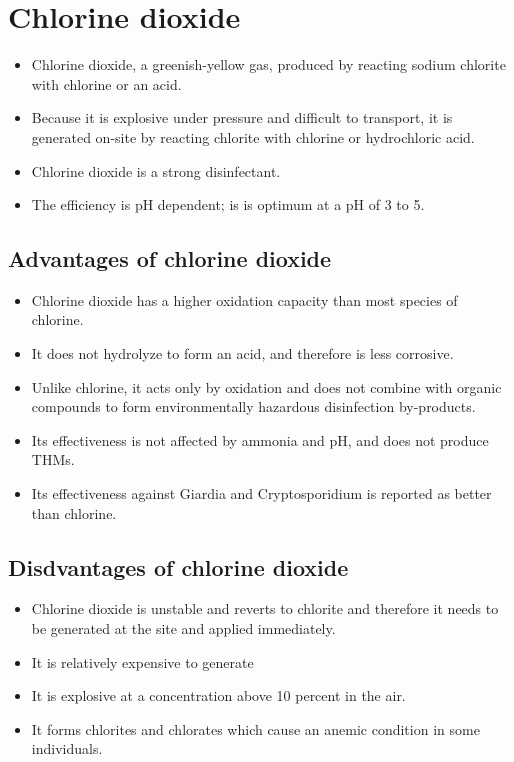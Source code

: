 \section{Chlorine dioxide}
\begin{itemize}
\item Chlorine dioxide, a greenish-yellow gas, produced by reacting sodium chlorite with chlorine or an acid.
\item Because it is explosive under pressure and difficult to transport, it is generated on-site by reacting chlorite with chlorine or hydrochloric acid.  
\item Chlorine dioxide is a strong disinfectant.
\item The efficiency is pH dependent; is is optimum at a pH of 3 to 5.  
\end{itemize}

\subsection{Advantages of chlorine dioxide}
\begin{itemize}
\item Chlorine dioxide has a higher oxidation capacity than most species of chlorine. 
\item It does not hydrolyze to form an acid, and therefore is less corrosive.
\item Unlike chlorine, it acts only by oxidation and does not combine with organic compounds to form environmentally hazardous disinfection by-products.
\item Its effectiveness is not affected by ammonia and pH, and does not produce THMs.
\item Its effectiveness against Giardia and Cryptosporidium is reported as better than chlorine.
\end{itemize}

\subsection{Disdvantages of chlorine dioxide}
\begin{itemize}
\item Chlorine dioxide is unstable and reverts to chlorite and therefore it needs to be generated at the site and applied immediately.
\item It is relatively expensive to generate
\item It is explosive at a concentration above 10 percent in the air.
\item It forms chlorites and chlorates which cause an anemic condition in some individuals.
\end{itemize}

